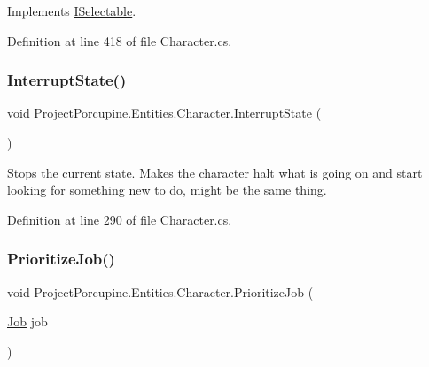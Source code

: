 Implements \hyperlink{interface_i_selectable_af676ba50e2cd5839438d3092743a79da}{I\+Selectable}.



Definition at line 418 of file Character.\+cs.

\mbox{\label{class_project_porcupine_1_1_entities_1_1_character_a8d7ae19ccf3405f0819149a6e5821fc2}} 
\subsubsection{\texorpdfstring{Interrupt\+State()}{InterruptState()}}
{\footnotesize\ttfamily void Project\+Porcupine.\+Entities.\+Character.\+Interrupt\+State (\begin{DoxyParamCaption}{ }\end{DoxyParamCaption})}



Stops the current state. Makes the character halt what is going on and start looking for something new to do, might be the same thing. 



Definition at line 290 of file Character.\+cs.

\mbox{\label{class_project_porcupine_1_1_entities_1_1_character_aef25ac994da838be626b8e364ba307c9}} 
\subsubsection{\texorpdfstring{Prioritize\+Job()}{PrioritizeJob()}}
{\footnotesize\ttfamily void Project\+Porcupine.\+Entities.\+Character.\+Prioritize\+Job (\begin{DoxyParamCaption}\item[{\hyperlink{class_job}{Job}}]{job }\end{DoxyParamCaption})}




